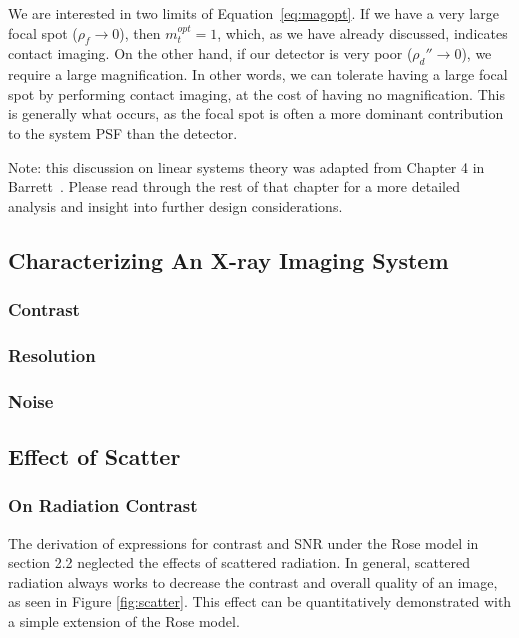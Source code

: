 \documentclass[mphy386-notes.tex]{subfiles}
\begin{document}
We are interested in two limits of Equation~\ref{eq:magopt}. If we have a very
large focal spot ($\rho_f \to 0$), then $m_t^{opt} = 1$, which, as we have already
discussed, indicates contact imaging. On the other hand, if our detector is very
poor ($\rho_d'' \to 0$), we require a large magnification. In other words, we can
tolerate having a large focal spot by performing contact imaging, at the cost of
having no magnification. This is generally what occurs, as the focal spot is
often a more dominant contribution to the system PSF than the detector.

Note: this discussion on linear systems theory was adapted from Chapter 4 in
Barrett~\cite{barrett}. Please read through the rest of that chapter for a more
detailed analysis and insight into further design considerations. 


\subsection{Characterizing An X-ray Imaging System}
\subsubsection{Contrast}
\subsubsection{Resolution}
\subsubsection{Noise}
\subsection{Effect of Scatter}


\subsubsection{On Radiation Contrast}

The derivation of expressions for contrast and SNR under the Rose model in
section 2.2 neglected the effects of scattered radiation. In general,
scattered radiation always works to decrease the contrast and overall
quality of an image, as seen in Figure \ref{fig:scatter}.
This effect can be quantitatively demonstrated with a simple extension
of the Rose model. 
\end{document}
